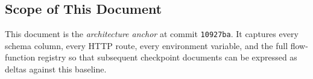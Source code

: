 \subsection{Scope of This Document}

This document is the \emph{architecture anchor} at commit
\texttt{10927ba}.  It captures every schema column, every HTTP route, every
environment variable, and the full flow-function registry so that subsequent
checkpoint documents can be expressed as deltas against this baseline.
